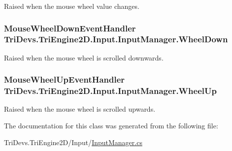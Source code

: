 Raised when the mouse wheel value changes. 

\hypertarget{class_tri_devs_1_1_tri_engine2_d_1_1_input_1_1_input_manager_a5d38d3fb1e2c2af1d89242d3708aa7af}{
\subsubsection[{Wheel\-Down}]{\setlength{\rightskip}{0pt plus 5cm}Mouse\-Wheel\-Down\-Event\-Handler Tri\-Devs.\-Tri\-Engine2\-D.\-Input.\-Input\-Manager.\-Wheel\-Down}}\label{class_tri_devs_1_1_tri_engine2_d_1_1_input_1_1_input_manager_a5d38d3fb1e2c2af1d89242d3708aa7af}


Raised when the mouse wheel is scrolled downwards. 

\hypertarget{class_tri_devs_1_1_tri_engine2_d_1_1_input_1_1_input_manager_a65ae1b2c58621de2cbc937b2e4042292}{
\subsubsection[{Wheel\-Up}]{\setlength{\rightskip}{0pt plus 5cm}Mouse\-Wheel\-Up\-Event\-Handler Tri\-Devs.\-Tri\-Engine2\-D.\-Input.\-Input\-Manager.\-Wheel\-Up}}\label{class_tri_devs_1_1_tri_engine2_d_1_1_input_1_1_input_manager_a65ae1b2c58621de2cbc937b2e4042292}


Raised when the mouse wheel is scrolled upwards. 



The documentation for this class was generated from the following file\-:\begin{DoxyCompactItemize}
\item 
Tri\-Devs.\-Tri\-Engine2\-D/\-Input/\hyperlink{_input_manager_8cs}{Input\-Manager.\-cs}\end{DoxyCompactItemize}
